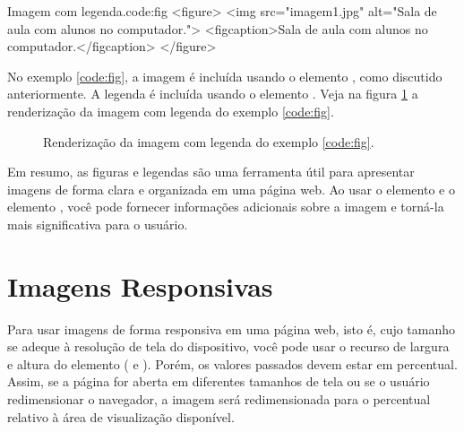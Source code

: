 \begin{htmlcode}{Imagem com legenda.}{code:fig}
<figure>
    <img src="imagem1.jpg" alt="Sala de aula com alunos no computador.">
    <figcaption>Sala de aula com alunos no computador.</figcaption>
</figure>
\end{htmlcode}

No exemplo \ref{code:fig}, a imagem é incluída usando o elemento , como discutido anteriormente. A legenda é incluída usando o elemento . Veja na figura \ref{fig:fig} a renderização da imagem com legenda do exemplo \ref{code:fig}.

\begin{figure}[ht!]    
    \caption{Renderização da imagem com legenda do exemplo \ref{code:fig}.}
    \label{fig:fig}
\end{figure}

Em resumo, as figuras e legendas são uma ferramenta útil para apresentar imagens de forma clara e organizada em uma página web. Ao usar o elemento  e o elemento , você pode fornecer informações adicionais sobre a imagem e torná-la mais significativa para o usuário.

\section{Imagens Responsivas}

Para usar imagens de forma responsiva em uma página web, isto é, cujo tamanho se adeque à resolução de tela do dispositivo, você pode usar o recurso de largura e altura do elemento  ( e ). Porém, os valores passados devem estar em percentual. Assim, se a página for aberta em diferentes tamanhos de tela ou se o usuário redimensionar o navegador, a imagem será redimensionada para o percentual relativo à área de visualização disponível.

